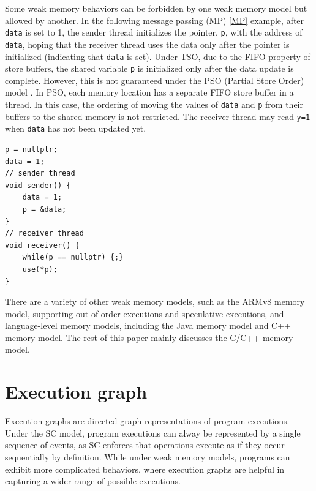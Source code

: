 Some weak memory behaviors can be forbidden by one weak memory model but allowed by another. In the following message passing (MP) \ref{MP} example, after \texttt{data} is set to 1, the sender thread initializes the pointer, \texttt{p}, with the address of \texttt{data}, hoping that the receiver thread uses the data only after the pointer is initialized (indicating that \texttt{data} is set). Under TSO, due to the FIFO property of store buffers, the shared variable \texttt{p} is initialized only after the data update is complete. However, this is not guaranteed under the PSO (Partial Store Order) model \cite{PSO}. In PSO, each memory location has a separate FIFO store buffer in a thread. In this case, the ordering of moving the values of \texttt{data} and \texttt{p} from their buffers to the shared memory is not restricted. The receiver thread may read \texttt{y=1} when \texttt{data} has not been updated yet.

\begin{lstlisting}[caption={Store Buffer (SB) program}, label={MP}]
p = nullptr;
data = 1;
// sender thread
void sender() {
    data = 1;
    p = &data;
}
// receiver thread
void receiver() {
    while(p == nullptr) {;}
    use(*p);
}
\end{lstlisting}


There are a variety of other weak memory models, such as the ARMv8 \cite{ARMv8} memory model, supporting out-of-order executions and speculative executions, and language-level  memory models, including the Java memory model\cite{java} and C++ memory model. The rest of this paper mainly discusses the C/C++ memory model\cite{c++model}.

\section{Execution graph}


Execution graphs are directed graph representations of program executions. Under the SC model, program executions can alway be represented by a single sequence of events, as SC enforces that operations execute as if they occur sequentially by definition. While under weak memory models, programs can exhibit more complicated behaviors, where execution graphs are helpful in capturing a wider range of possible executions.

